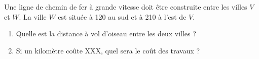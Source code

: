 
\begin{exercice}\label{exosmath-0293}

    Une ligne de chemin de fer à grande vitesse doit être construite entre les villes \( V\) et \( W\). La ville \( W\) est située à \unit{120}{\kilo\meter} au sud et à \unit{210}{\kilo\meter} à l'est de \( V\).
    \begin{enumerate}
        \item
            Quelle est la distance à vol d'oiseau entre les deux villes ?
        \item
            Si un kilomètre coûte XXX, quel sera le coût des travaux ?
    \end{enumerate}
    

\end{exercice} 
